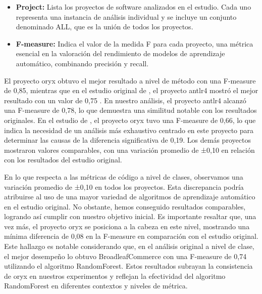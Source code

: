 \begin{itemize}
  \item \textbf{Project:} Lista los proyectos de software analizados en el estudio. Cada uno representa una instancia de análisis individual y se incluye un conjunto denominado ALL, que es la unión de todos los proyectos.
  \item \textbf{F-measure:} Indica el valor de la medida F para cada proyecto, una métrica esencial en la valoración del rendimiento de modelos de aprendizaje automático, combinando precisión y recall.
\end{itemize}




El proyecto oryx obtuvo el mejor resultado a nivel de método con una F-measure de 0,85, mientras que en el estudio original de \cite{ferenc_automatically_2020}, el proyecto antlr4 mostró el mejor resultado con un valor de 0,75 \cite{ferenc_automatically_2020}. En nuestro análisis, el proyecto antlr4 alcanzó una F-measure de 0,78, lo que demuestra una similitud notable con los resultados originales. En el estudio de \cite{ferenc_automatically_2020}, el proyecto oryx tuvo una F-measure de 0,66, lo que indica la necesidad de un análisis más exhaustivo centrado en este proyecto para determinar las causas de la diferencia significativa de 0,19. Los demás proyectos mostraron valores comparables, con una variación promedio de ±0,10 en relación con los resultados del estudio original.



En lo que respecta a las métricas de código a nivel de clases, observamos una variación promedio de ±0,10 en todos los proyectos. Esta discrepancia podría atribuirse al uso de una mayor variedad de algoritmos de aprendizaje automático en el estudio original. No obstante, hemos conseguido resultados comparables, logrando así cumplir con nuestro objetivo inicial. Es importante resaltar que, una vez más, el proyecto oryx se posiciona a la cabeza en este nivel, mostrando una mínima diferencia de 0,08 en la F-measure en comparación con el estudio original. Este hallazgo es notable considerando que, en el análisis original a nivel de clase, el mejor desempeño lo obtuvo BroadleafCommerce con una F-measure de 0,74 utilizando el algoritmo RandomForest. Estos resultados subrayan la consistencia de oryx en nuestros experimentos y reflejan la efectividad del algoritmo RandomForest en diferentes contextos y niveles de métrica.

